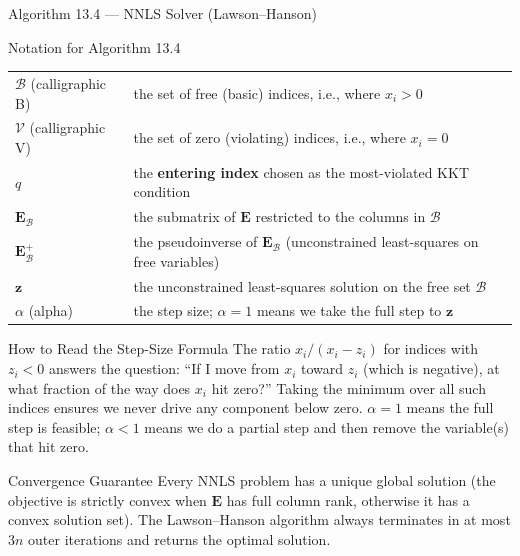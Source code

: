 \documentclass[aspectratio=169,10pt]{beamer}
\newcommand{\bE}{\mathbf{E}}
\begin{document}
\begin{frame}[allowframebreaks]{Algorithm 13.4 --- NNLS Solver (Lawson--Hanson)}
  \framebreak

  \begin{block}{Notation for Algorithm 13.4}
    \begin{tabular}{ll}
      $\mathcal{B}$ (calligraphic B) & the set of free (basic) indices, i.e., where $x_i > 0$\\
      $\mathcal{V}$ (calligraphic V) & the set of zero (violating) indices, i.e., where $x_i = 0$\\
      $q$ & the \textbf{entering index} chosen as the most-violated KKT condition\\
      $\bE_{\mathcal{B}}$ & the submatrix of $\bE$ restricted to the columns in $\mathcal{B}$\\
      $\bE_{\mathcal{B}}^+$ & the pseudoinverse of $\bE_{\mathcal{B}}$ (unconstrained least-squares on free variables)\\
      $\mathbf{z}$ & the unconstrained least-squares solution on the free set $\mathcal{B}$\\
      $\alpha$ (alpha) & the step size; $\alpha = 1$ means we take the full step to $\mathbf{z}$\\
    \end{tabular}
  \end{block}

  \begin{alertblock}{How to Read the Step-Size Formula}
    The ratio $x_i / (x_i - z_i)$ for indices with $z_i < 0$ answers the question:
    ``If I move from $x_i$ toward $z_i$ (which is negative), at what fraction of the
    way does $x_i$ hit zero?''  Taking the minimum over all such indices ensures we
    never drive any component below zero.  $\alpha = 1$ means the full step is
    feasible; $\alpha < 1$ means we do a partial step and then remove the variable(s)
    that hit zero.
  \end{alertblock}

  \begin{block}{Convergence Guarantee}
    Every NNLS problem has a unique global solution (the objective is strictly convex
    when $\bE$ has full column rank, otherwise it has a convex solution set).
    The Lawson--Hanson algorithm always terminates in at most $3n$ outer iterations
    and returns the optimal solution.
  \end{block}

\end{frame}
\end{document}
